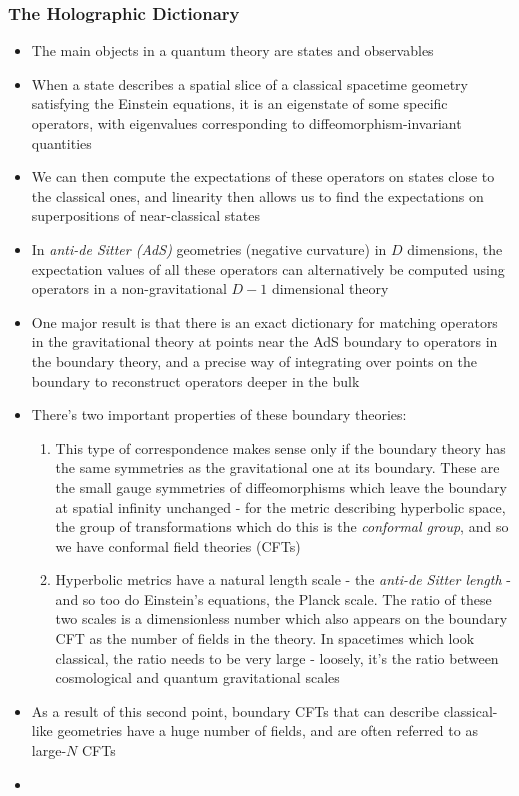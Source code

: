 \documentclass[12pt,a4paper]{article}
\numberwithin{equation}{section}
\begin{document}
	\subsubsection{The Holographic Dictionary}
	\begin{itemize}
		\item The main objects in a quantum theory are states and observables
		\item When a state describes a spatial slice of a classical spacetime geometry satisfying the Einstein equations, it is an eigenstate of some specific operators, with eigenvalues corresponding to diffeomorphism-invariant quantities
		\item We can then compute the expectations of these operators on states close to the classical ones, and linearity then allows us to find the expectations on superpositions of near-classical states
		\item In \textit{anti-de Sitter (AdS)} geometries (negative curvature) in $D$ dimensions, the expectation values of all these operators can alternatively be computed using operators in a non-gravitational $D-1$ dimensional theory
		\item One major result is that there is an exact dictionary for matching operators in the gravitational theory at points near the AdS boundary to operators in the boundary theory, and a precise way of integrating over points on the boundary to reconstruct operators deeper in the bulk
		\item There's two important properties of these boundary theories:
		\begin{enumerate}
			\item This type of correspondence makes sense only if the boundary theory has the same symmetries as the gravitational one at its boundary. These are the small gauge symmetries of diffeomorphisms which leave the boundary at spatial infinity unchanged - for the metric describing hyperbolic space, the group of transformations which do this is the \textit{conformal group}, and so we have conformal field theories (CFTs)
			\item Hyperbolic metrics have a natural length scale - the \textit{anti-de Sitter length} - and so too do Einstein's equations, the Planck scale. The ratio of these two scales is a dimensionless number which also appears on the boundary CFT as the number of fields in the theory. In spacetimes which look classical, the ratio needs to be very large - loosely, it's the ratio between cosmological and quantum gravitational scales
		\end{enumerate}
		\item As a result of this second point, boundary CFTs that can describe classical-like geometries have a huge number of fields, and are often referred to as large-$N$ CFTs
		\item 
	\end{itemize}
\end{document}

